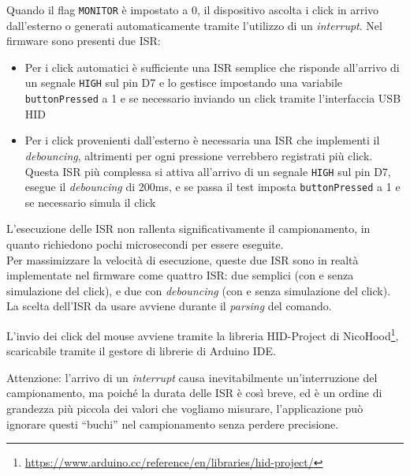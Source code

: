 Quando il flag \texttt{MONITOR} è impostato a 0, il dispositivo ascolta i click in arrivo dall'esterno o generati automaticamente tramite l'utilizzo di un \textit{interrupt}. Nel firmware sono presenti due ISR:\begin{itemize}
	\item Per i click automatici è sufficiente una ISR semplice che risponde all'arrivo di un segnale \texttt{HIGH} sul pin D7 e lo gestisce impostando una variabile \texttt{buttonPressed} a 1 e se necessario inviando un click tramite l'interfaccia USB HID
	\item Per i click provenienti dall'esterno è necessaria una ISR che implementi il \textit{debouncing}, altrimenti per ogni pressione verrebbero registrati più click. Questa ISR più complessa si attiva all'arrivo di un segnale \texttt{HIGH} sul pin D7, esegue il \textit{debouncing} di 200ms, e se passa il test imposta \texttt{buttonPressed} a 1 e se necessario simula il click
\end{itemize}

L'esecuzione delle ISR non rallenta significativamente il campionamento, in quanto richiedono pochi microsecondi per essere eseguite.\\
Per massimizzare la velocità di esecuzione, queste due ISR sono in realtà implementate nel firmware come quattro ISR: due semplici (con e senza simulazione del click), e due con \textit{debouncing} (con e senza simulazione del click). La scelta dell'ISR da usare avviene durante il \textit{parsing} del comando.

L'invio dei click del mouse avviene tramite la libreria HID-Project di NicoHood\footnote{\href{https://www.arduino.cc/reference/en/libraries/hid-project/}{https://www.arduino.cc/reference/en/libraries/hid-project/}}, scaricabile tramite il gestore di librerie di Arduino IDE.

Attenzione: l'arrivo di un \textit{interrupt} causa inevitabilmente un'interruzione del campionamento, ma poiché la durata delle ISR è così breve, ed è un ordine di grandezza più piccola dei valori che vogliamo misurare, l'applicazione può ignorare questi ``buchi'' nel campionamento senza perdere precisione.

